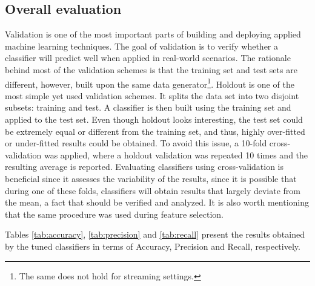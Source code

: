 \documentclass[11pt]{article}
\begin{document}
	\subsection{Overall evaluation} \label{sec:overallEvaluation}
	
		Validation is one of the most important parts of building and deploying applied machine learning techniques.
		The goal of validation is to verify whether a classifier will predict well when applied in real-world scenarios.
		The rationale behind most of the validation schemes is that the training set and test sets are different, however, built upon the same data generator\footnote{The same does not hold for streaming settings.}.
		Holdout is one of the most simple yet used validation schemes.
		It splits the data set into two disjoint subsets: training and test.
		A classifier is then built using the training set and applied to the test set.
		Even though holdout looks interesting, the test set could be extremely equal or different from the training set, and thus, highly over-fitted or under-fitted results could be obtained.
		To avoid this issue, a 10-fold cross-validation was applied, where a holdout validation was repeated 10 times and the resulting average  is reported.
		Evaluating classifiers using cross-validation is beneficial since it assesses the variability of the results, since it is possible that during one of these folds, classifiers will obtain results that largely deviate from the mean, a fact that should be verified and analyzed.
		It is also worth mentioning that the same procedure was used during feature selection.
						
		Tables \ref{tab:accuracy}, \ref{tab:precision} and \ref{tab:recall} present the results obtained by the tuned classifiers in terms of Accuracy, Precision and Recall, respectively.


		\begin{table}[!t]
			\centering
			\caption{Average accuracy (\%) obtained in the test script.}
			\label{tab:accuracy}
		\end{table}
	
\end{document}
